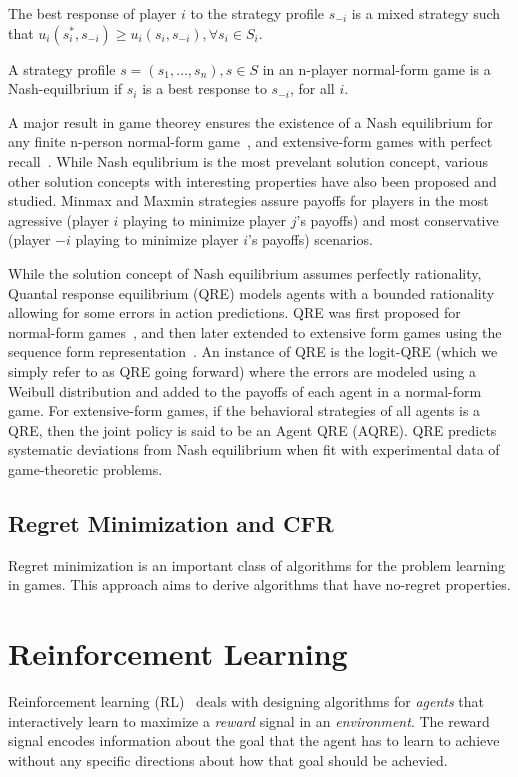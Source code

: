 The best response of player $i$ to the strategy profile $s_{-i}$ is a mixed strategy such that
$u_i(s_i^\ast, s_{-i}) \geq u_i(s_i, s_{-i}), \forall s_i \in S_i$.

\begin{definition}
	A strategy profile $s=(s_1, \dots, s_n), s \in S$ in an n-player normal-form game is a Nash-equilbrium if $s_i$ is a best response to $s_{-i}$, for all
	$i$.
\end{definition}

A major result in game theorey ensures the existence of a Nash equilibrium for any finite n-person
normal-form game~\cite{nashEquilibrium1950}, and extensive-form games with perfect
recall~\cite{kuhnExtensive1950}.
While Nash equlibrium is the most prevelant solution concept, various other solution concepts with
interesting properties have also been proposed and studied.
Minmax and Maxmin strategies assure payoffs for players in the most agressive (player $i$ playing
to minimize player $j$'s payoffs) and most conservative (player $-i$ playing to minimize player
$i$'s payoffs) scenarios.

While the solution concept of Nash equilibrium assumes perfectly rationality, Quantal response
equilibrium (QRE) models agents with a bounded rationality allowing for some errors in action
predictions.
QRE was first proposed for normal-form games~\cite{mckelveyQuantal1995}, and then later extended to
extensive form games using the sequence form representation~\cite{mckelveyQuantal1998}.
An instance of QRE is the logit-QRE (which we simply refer to as QRE going forward) where the
errors are modeled using a Weibull distribution and added to the payoffs of each agent in a
normal-form game.
For extensive-form games, if the behavioral strategies of all agents is a QRE, then the joint
policy is said to be an Agent QRE (AQRE).
QRE predicts systematic deviations from Nash equilibrium when fit with experimental data of
game-theoretic problems.

\subsection{Regret Minimization and CFR}
Regret minimization is an important class of algorithms for the problem learning in games.
This approach aims to derive algorithms that have no-regret properties.

\section{Reinforcement
  Learning}
Reinforcement learning (RL)~\cite{suttonReinforcement2018} deals with designing algorithms for
\textit{agents} that interactively learn to maximize a \textit{reward} signal in an
\textit{environment}.
The reward signal encodes information about the goal that the agent has to learn to achieve without
any specific directions about how that goal should be achevied.

